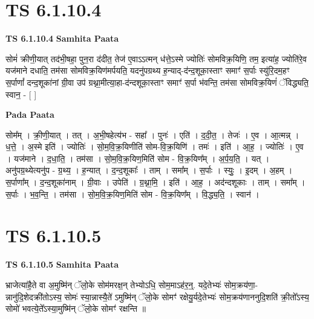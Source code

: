 \documentclass[17pt]{extarticle}
\begin{document}
\section*{ TS 6.1.10.4 }

\textbf{TS 6.1.10.4 } \newline
\textbf{Samhita Paata} \newline

सोमं॑ क्रीणी॒यात् तद॑भी॒षहा॒ पुन॒रा द॑दीत॒ तेज॑ ए॒वाऽऽत्मन् ध॑त्ते॒ऽस्मे ज्योतिः॑ सोमविक्र॒यिणि॒ तम॒ इत्या॑ह॒ ज्योति॑रे॒व यज॑माने दधाति॒ तम॑सा सोमविक्र॒यिण॑मर्पयति॒ यदनु॑पग्रथ्य ह॒न्याद्-द॑न्द॒शूका॒स्ताꣳ समाꣳ॑ स॒र्पाः स्यु॑रि॒दम॒हꣳ स॒र्पाणां᳚ दन्द॒शूका॑नां ग्री॒वा उप॑ ग्रथ्ना॒मीत्या॒हा-द॑न्दशूका॒स्ताꣳ समाꣳ॑ स॒र्पा भ॑वन्ति॒ तम॑सा सोमविक्र॒यिणं॑ ॅविद्ध्यति॒ स्वान॒ - [  ] \newline

\textbf{Pada Paata} \newline

सोम᳚म् । क्री॒णी॒यात् । तत् । अ॒भी॒षहेत्य॑भ - सहा᳚ । पुनः॑ । एति॑ । द॒दी॒त॒ । तेजः॑ । ए॒व । आ॒त्मन्न् । ध॒त्ते॒ । अ॒स्मे इति॑ । ज्योतिः॑ । सो॒म॒वि॒क्र॒यिणीति॑ सोम-वि॒क्र॒यिणि॑ । तमः॑ । इति॑ । आ॒ह॒ । ज्योतिः॑ । ए॒व । यज॑माने । द॒धा॒ति॒ । तम॑सा । सो॒म॒वि॒क्र॒यिण॒मिति॑ सोम - वि॒क्र॒यिण᳚म् । अ॒र्प॒य॒ति॒ । यत् । अनु॑पग्र॒थ्येत्यनु॑प - ग्र॒थ्य॒ । ह॒न्यात् । द॒न्द॒शूकाः᳚ । ताम् । समा᳚म् । स॒र्पाः । स्युः॒ । इ॒दम् । अ॒हम् । स॒र्पाणा᳚म् । द॒न्द॒शूका॑नाम् । ग्री॒वाः । उपेति॑ । ग्र॒थ्ना॒मि॒ । इति॑ । आ॒ह॒ । अद॑न्दशूकाः । ताम् । समा᳚म् । स॒र्पाः । भ॒व॒न्ति॒ । तम॑सा । सो॒म॒वि॒क्र॒यिण॒मिति॑ सोम - वि॒क्र॒यिण᳚म् । वि॒द्ध्य॒ति॒ । स्वान॑ ।  \newline




\section*{ TS 6.1.10.5 }

\textbf{TS 6.1.10.5 } \newline
\textbf{Samhita Paata} \newline

भ्राजेत्या॑है॒ते वा अ॒मुष्मि॑न् ॅलो॒के सोम॑मरक्ष॒न् तेभ्योऽधि॒ सोम॒माऽह॑र॒न्॒. यदे॒तेभ्यः॑ सोम॒क्रय॑णा॒-न्नानु॑दि॒शेदक्री॑तोऽस्य॒ सोमः॑ स्या॒न्नास्यै॒ते॑ ऽमुष्मि॑न् ॅलो॒के सोमꣳ॑ रक्षेयु॒र्यदे॒तेभ्यः॑ सोम॒क्रय॑णाननुदि॒शति॑ क्री॒तो᳚ऽस्य॒ सोमो॑ भवत्ये॒ते᳚ऽस्या॒मुष्मि॑न् ॅलो॒के सोमꣳ॑ रक्षन्ति ॥ \newline
\end{document}
